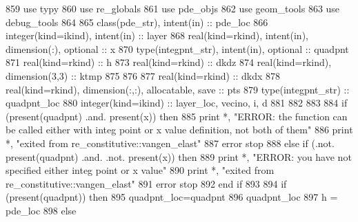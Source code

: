 \begin{DoxyCode}
859       \textcolor{keywordtype}{use }typy
860       \textcolor{keywordtype}{use }re_globals
861       \textcolor{keywordtype}{use }pde_objs
862       \textcolor{keywordtype}{use }geom_tools
863       \textcolor{keywordtype}{use }debug_tools
864 
865       \textcolor{keywordtype}{class}(pde_str), \textcolor{keywordtype}{intent(in)} :: pde\_loc 
866       \textcolor{keywordtype}{integer(kind=ikind)}, \textcolor{keywordtype}{intent(in)} :: layer
868       \textcolor{keywordtype}{real(kind=rkind)}, \textcolor{keywordtype}{intent(in)}, \textcolor{keywordtype}{dimension(:)},  \textcolor{keywordtype}{optional} :: x
870       \textcolor{keywordtype}{type}(integpnt_str), \textcolor{keywordtype}{intent(in)}, \textcolor{keywordtype}{optional} :: quadpnt
871       \textcolor{keywordtype}{real(kind=rkind)} :: h
873       \textcolor{keywordtype}{real(kind=rkind)} :: dkdz
874       \textcolor{keywordtype}{real(kind=rkind)}, \textcolor{keywordtype}{dimension(3,3)} :: ktmp
875       
876       
877       \textcolor{keywordtype}{real(kind=rkind)} :: dkdx
878       \textcolor{keywordtype}{real(kind=rkind)}, \textcolor{keywordtype}{dimension(:,:)}, \textcolor{keywordtype}{allocatable}, \textcolor{keywordtype}{save} :: pts
879       \textcolor{keywordtype}{type}(integpnt_str) :: quadpnt\_loc
880       \textcolor{keywordtype}{integer(kind=ikind)} :: layer\_loc, vecino, i, d   
881 
882 
883       
884       \textcolor{keywordflow}{if} (\textcolor{keyword}{present}(quadpnt) .and. \textcolor{keyword}{present}(x)) \textcolor{keywordflow}{then}
885         print *, \textcolor{stringliteral}{"ERROR: the function can be called either with integ point or x value definition, not both
       of them"}
886         print *, \textcolor{stringliteral}{"exited from re\_constitutive::vangen\_elast"}
887         error stop
888       \textcolor{keywordflow}{else} \textcolor{keywordflow}{if} (.not. \textcolor{keyword}{present}(quadpnt) .and. .not. \textcolor{keyword}{present}(x)) \textcolor{keywordflow}{then}
889         print *, \textcolor{stringliteral}{"ERROR: you have not specified either integ point or x value"}
890         print *, \textcolor{stringliteral}{"exited from re\_constitutive::vangen\_elast"}
891         error stop
892 \textcolor{keywordflow}{      end if}
893       
894       \textcolor{keywordflow}{if} (\textcolor{keyword}{present}(quadpnt)) \textcolor{keywordflow}{then}
895         quadpnt\_loc=quadpnt
896         quadpnt\_loc%
897         h = pde\_loc%
898       \textcolor{keywordflow}{else}

\end{DoxyCode}
